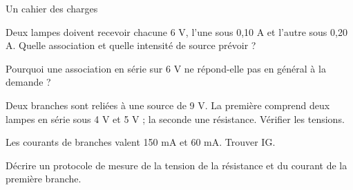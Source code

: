 \par\noindent\begin{minipage}{\linewidth}
\begin{exercice}[3]{Un cahier des charges}
\begin{questions}
\item Deux lampes doivent recevoir chacune 6 V, l’une sous 0,10 A et l’autre sous 0,20 A. Quelle association et quelle intensité de source prévoir ?
\item Pourquoi une association en série sur 6 V ne répond-elle pas en général à la demande ?
\end{questions}
\end{exercice}
\end{minipage}
\label{defi-ex-13}
\begin{questions}
\item Deux branches sont reliées à une source de 9 V. La première comprend deux lampes en série sous 4 V et 5 V ; la seconde une résistance. Vérifier les tensions.
\item Les courants de branches valent 150 mA et 60 mA. Trouver IG.
\item Décrire un protocole de mesure de la tension de la résistance et du courant de la première branche.
\end{questions}
\pcGrille
